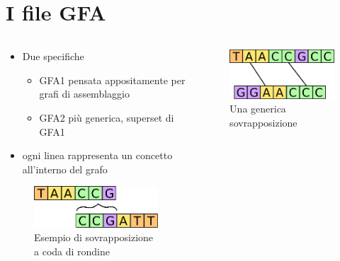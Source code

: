 \documentclass{beamer}
\begin{document}
 
 \section{I file GFA}
 \begin{frame}[fragile]{\secname}
 	\begin{columns}[b, onlytextwidth]
 		\begin{column}{0.7\textwidth}
 			\begin{itemize}
				\item Due specifiche
					\begin{itemize}
							\item GFA1 pensata appositamente per grafi di assemblaggio
							\item GFA2 più generica, superset di GFA1
					\end{itemize}					
				\item ogni linea rappresenta un concetto
					all'interno del grafo
 			\end{itemize}
 			\begin{figure}
 				\centering
 				\captionsetup{justification=centering}
 				\includegraphics[scale=0.30]{dov_ov_++}
 				\caption{Esempio di sovrapposizione\\a coda di rondine}
 			\end{figure}
 		\end{column}
 		\begin{column}{0.3\textwidth}
 			\begin{figure}
 				\centering
 				\captionsetup{justification=centering}
 				\includegraphics[scale=0.27]{generic-overlap}
 				\caption{Una generica sovrapposizione}
 			\end{figure}
 		\end{column}
 	\end{columns}
 \end{frame}
 
\end{document}
